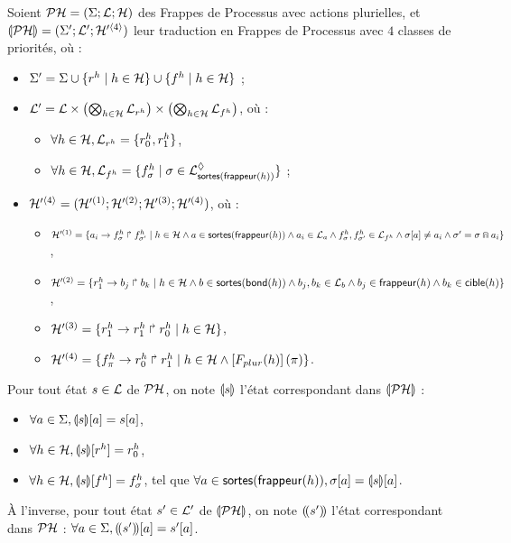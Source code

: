 \begin{definition}
  Soient $\mathcal{PH} = (\Sigma; \mathcal{L}; \mathcal{H})$ des Frappes de Processus avec actions plurielles,
  et $\llparenthesis \mathcal{PH} \rrparenthesis = (\Sigma'; \mathcal{L}'; \mathcal{H}'^{\langle 4 \rangle})$
  leur traduction en Frappes de Processus avec $4$ classes de priorités, où :
  \begin{itemize}
    \item $\Sigma' = \Sigma \cup \{ r^{h} \mid h \in \mathcal{H} \} \cup \{ f^{h} \mid h \in \mathcal{H} \}$ ;
    \item $\mathcal{L}' = \mathcal{L} \times \left( \bigotimes_{h \in \mathcal{H}} \mathcal{L}_{r^{h}} \right)
      \times \left( \bigotimes_{h \in \mathcal{H}} \mathcal{L}_{f^{h}} \right)$, où :
      \begin{itemize}
        \item $\forall h \in \mathcal{H}, \mathcal{L}_{r^{h}} = \{ r^{h}_0 , r^{h}_1 \}$,
        \item $\forall h \in \mathcal{H}, \mathcal{L}_{f^{h}} = \{ f^{h}_\sigma \mid
          \sigma \in \mathcal{L}^\lozenge_{\mathsf{sortes}(\mathsf{frappeur}(h))} \}$ ;
      \end{itemize}
    \item $\mathcal{H}'^{\langle 4 \rangle} = ( \mathcal{H}'^{(1)} ; \mathcal{H}'^{(2)} ; \mathcal{H}'^{(3)} ; \mathcal{H}'^{(4)} )$, où :
      \begin{itemize}
        \item $\mathcal{H}'^{(1)} = \{ a_i\rightarrow f^{h}_\sigma\Rsh f^{h}_{\sigma'} \mid
          h \in \mathcal{H} \wedge a \in \mathsf{sortes}(\mathsf{frappeur}(h)) \wedge a_i \in \mathcal{L}_a \wedge
          f^{h}_\sigma , f^{h}_{\sigma'} \in \mathcal{L}_{f^{h}} \wedge
          {\sigma[a]} \neq a_i \wedge \sigma' = \sigma \Cap a_i \}$,
        \item $\mathcal{H}'^{(2)} = \{ r^{h}_1\rightarrow b_j\Rsh b_k \mid
          h \in \mathcal{H} \wedge b \in \mathsf{sortes}(\mathsf{bond}(h)) \wedge b_j, b_k \in \mathcal{L}_b \wedge
          b_j \in \mathsf{frappeur}(h) \wedge b_k \in \mathsf{cible}(h) \}$,
        \item $\mathcal{H}'^{(3)} = \{ r^{h}_1\rightarrow r^{h}_1\Rsh r^{h}_0 \mid h \in \mathcal{H} \}$,
        \item $\mathcal{H}'^{(4)} = \{ f^{h}_\pi\rightarrow r^{h}_0\Rsh r^{h}_1 \mid
          h \in \mathcal{H} \wedge \left[F_{plur}(h)\right](\pi) \}$.
      \end{itemize}
  \end{itemize}
  Pour tout état $s \in \mathcal{L}$ de $\mathcal{PH}$,
  on note $\llparenthesis s \rrparenthesis$ l'état correspondant dans $\llparenthesis \mathcal{PH} \rrparenthesis$ :
  \begin{itemize}
    \item $\forall a \in \Sigma, {\llparenthesis s \rrparenthesis[a]} = {s[a]}$,
    \item $\forall h \in \mathcal{H}, {\llparenthesis s \rrparenthesis[r^{h}]} = r^{h}_0$,
    \item $\forall h \in \mathcal{H}, {\llparenthesis s \rrparenthesis[f^{h}]} = f^{h}_\sigma$,
      tel que $\forall a \in \mathsf{sortes}(\mathsf{frappeur}(h)), {\sigma[a]} = {\llparenthesis s \rrparenthesis[a]}$.
  \end{itemize}
  À l'inverse, pour tout état $s' \in \mathcal{L}'$ de $\llparenthesis \mathcal{PH} \rrparenthesis$,
  on note $(\!(s')\!)$ l'état correspondant dans $\mathcal{PH}$ :
  $\forall a \in \Sigma, {(\!(s')\!)[a]} = {s'[a]}$.
\end{definition}

